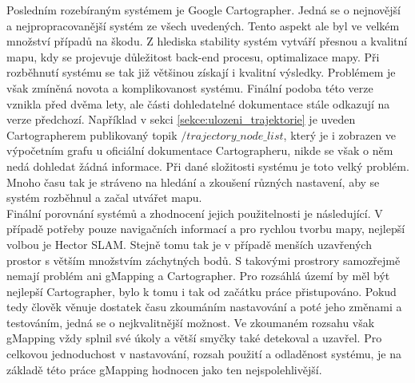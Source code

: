 \documentclass[12pt]{report}
\begin{document}
\indent Posledním rozebíraným systémem je Google Cartographer. Jedná se o nejnovější a nejpropracovanější systém ze všech uvedených. Tento aspekt ale byl ve velkém množství případů na škodu. Z hlediska stability systém vytváří přesnou a kvalitní mapu, kdy se projevuje důležitost back-end procesu, optimalizace mapy. Při rozběhnutí systému se tak již většinou získají i kvalitní výsledky. Problémem je však zmíněná novota a komplikovanost systému. Finální podoba této verze vznikla před dvěma lety, ale části dohledatelné dokumentace stále odkazují na verze předchozí. Například v sekci \ref{sekce:ulozeni_trajektorie} je uveden Cartographerem publikovaný topik $/trajectory\_node\_list$, který je i zobrazen ve výpočetním grafu u oficiální dokumentace Cartographeru, nikde se však o něm nedá dohledat žádná informace. Při dané složitosti systému je toto velký problém. Mnoho času tak je stráveno na hledání a zkoušení různých nastavení, aby se systém rozběhnul a začal utvářet mapu.\\
\indent Finální porovnání systémů a zhodnocení jejich použitelnosti je následující. V případě potřeby pouze navigačních informací a pro rychlou tvorbu mapy, nejlepší volbou je Hector SLAM. Stejně tomu tak je v případě menších uzavřených prostor s větším množstvím záchytných bodů. S takovými prostrory samozřejmě nemají problém ani gMapping a Cartographer. Pro rozsáhlá území by měl být nejlepší Cartographer, bylo k tomu i tak od začátku práce přistupováno. Pokud tedy člověk věnuje dostatek času zkoumáním nastavování a poté jeho změnami a testováním, jedná se o nejkvalitnější možnost. Ve zkoumaném rozsahu však gMapping vždy splnil své úkoly a větší smyčky také detekoval a uzavřel. Pro celkovou jednoduchost v nastavování, rozsah použití a odladěnost systému, je na základě této práce gMapping hodnocen jako ten nejspolehlivější.
\end{document}
